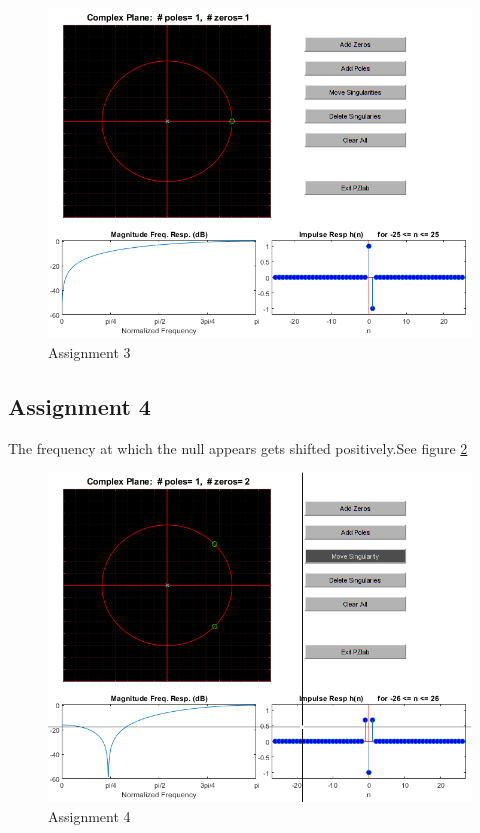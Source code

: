 \documentclass[a4paper]{article}
\begin{document}
\begin{figure}
    \centering
    \includegraphics{2.png}
    \caption{Assignment 3}
    \label{fig:2}
\end{figure}
\subsection{Assignment 4}
The frequency at which the null appears gets shifted positively.See figure \ref{fig:3}

\begin{figure}
    \centering
    \includegraphics{3.png}
    \caption{Assignment 4}
    \label{fig:3}
\end{figure}
\end{document}
